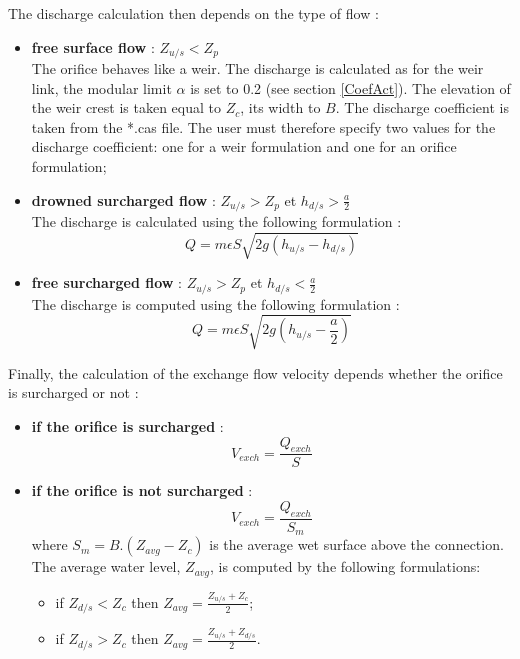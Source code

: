 The discharge calculation then depends on the type of flow :

\begin{itemize}
 \item \textbf{free surface flow} : $Z_{u/s} < Z_p$ \\
    The orifice behaves like a weir. The discharge is calculated as for the weir link, the modular limit $\alpha$ is set to 0.2 (see section \ref{CoefAct}). The elevation of the weir crest is taken equal to $Z_c$, its width to $B$. The discharge coefficient is taken from the *.cas file. The user must therefore specify two values for the discharge coefficient: one for a weir formulation and one for an orifice formulation;
 \item \textbf{drowned surcharged flow} : $Z_{u/s} > Z_p$ et $h_{d/s} > \frac{a}{2}$ \\
    The discharge is calculated using the following formulation :
    \begin{equation}
      Q = m \epsilon S \sqrt{2 g (h_{u/s}-h_{d/s})}
    \end{equation}
 \item \textbf{free surcharged flow} : $Z_{u/s} > Z_p$ et $h_{d/s} < \frac{a}{2}$ \\
    The discharge is computed using the following formulation :
    \begin{equation}
      Q = m \epsilon S \sqrt{2 g (h_{u/s}-\frac{a}{2})}
    \end{equation}
\end{itemize}

Finally, the calculation of the exchange flow velocity depends whether the orifice is surcharged or not :

\begin{itemize}
 \item \textbf{if the orifice is surcharged} :
   \begin{equation}
     V_{exch} = \frac{Q_{exch}}{S}
   \end{equation}
 \item \textbf{if the orifice is not surcharged} :
   \begin{equation}
     V_{exch} = \frac{Q_{exch}}{S_m}
   \end{equation}
   where $S_m = B . (Z_{avg}-Z_c)$ is the average wet surface above the connection. The average water level, $Z_{avg}$, is computed by the following formulations:
   \begin{itemize}
     \item if $Z_{d/s} < Z_c$ then $Z_{avg} = \frac{Z_{u/s}+Z_c}{2}$;
     \item if $Z_{d/s} > Z_c$ then $Z_{avg} = \frac{Z_{u/s}+Z_{d/s}}{2}$.
   \end{itemize}
\end{itemize}



